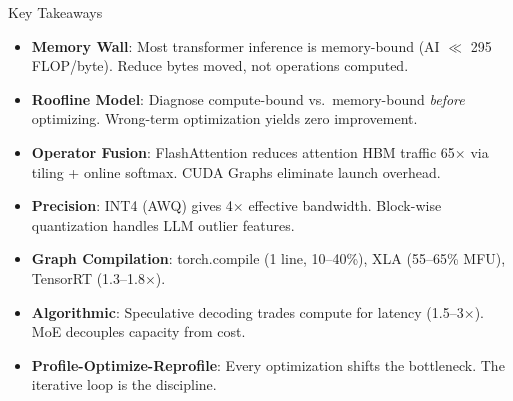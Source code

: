 \documentclass[aspectratio=169, 12pt]{beamer}
\begin{document}
\begin{frame}{Key Takeaways}

\scriptsize
\begin{itemize}\setlength\itemsep{0pt}
  \item \textbf{Memory Wall}: Most transformer inference is memory-bound (AI $\ll$ 295 FLOP/byte). Reduce bytes moved, not operations computed.
  \item \textbf{Roofline Model}: Diagnose compute-bound vs.\ memory-bound \emph{before} optimizing. Wrong-term optimization yields zero improvement.
  \item \textbf{Operator Fusion}: FlashAttention reduces attention HBM traffic 65$\times$ via tiling + online softmax. CUDA Graphs eliminate launch overhead.
  \item \textbf{Precision}: INT4 (AWQ) gives 4$\times$ effective bandwidth. Block-wise quantization handles LLM outlier features.
  \item \textbf{Graph Compilation}: torch.compile (1 line, 10--40\%), XLA (55--65\% MFU), TensorRT (1.3--1.8$\times$).
  \item \textbf{Algorithmic}: Speculative decoding trades compute for latency (1.5--3$\times$). MoE decouples capacity from cost.
  \item \textbf{Profile-Optimize-Reprofile}: Every optimization shifts the bottleneck. The iterative loop is the discipline.
\end{itemize}

\end{frame}
\end{document}
